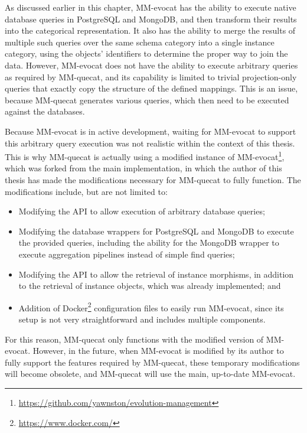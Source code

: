 As discussed earlier in this chapter, MM-evocat has the ability to execute native database queries in PostgreSQL and MongoDB, and then transform their results into the categorical representation.
It also has the ability to merge the results of multiple such queries over the same schema category into a single instance category, using the objects' identifiers to determine the proper way to join the data.
However, MM-evocat does not have the ability to execute arbitrary queries as required by MM-quecat, and its capability is limited to trivial projection-only queries that exactly copy the structure of the defined mappings.
This is an issue, because MM-quecat generates various queries, which then need to be executed against the databases.

Because MM-evocat is in active development, waiting for MM-evocat to support this arbitrary query execution was not realistic within the context of this thesis.
This is why MM-quecat is actually using a modified instance of MM-evocat\footnote{\url{https://github.com/yawnston/evolution-management}}, which was forked from the main implementation, in which the author of this thesis has made the modifications necessary for MM-quecat to fully function.
The modifications include, but are not limited to:

\begin{itemize}
    \item Modifying the API to allow execution of arbitrary database queries;
    \item Modifying the database wrappers for PostgreSQL and MongoDB to execute the provided queries, including the ability for the MongoDB wrapper to execute aggregation pipelines instead of simple find queries;
    \item Modifying the API to allow the retrieval of instance morphisms, in addition to the retrieval of instance objects, which was already implemented; and
    \item Addition of Docker\footnote{\url{https://www.docker.com/}} configuration files to easily run MM-evocat, since its setup is not very straightforward and includes multiple components.
\end{itemize}

For this reason, MM-quecat only functions with the modified version of MM-evocat.
However, in the future, when MM-evocat is modified by its author to fully support the features required by MM-quecat, these temporary modifications will become obsolete, and MM-quecat will use the main, up-to-date MM-evocat.

